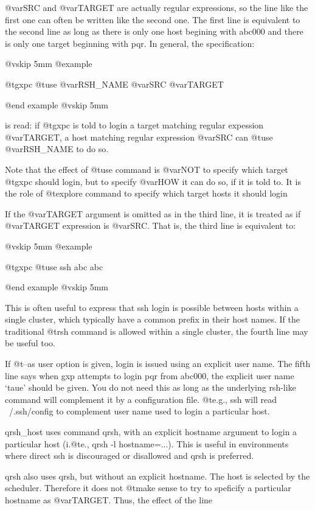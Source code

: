 @var{SRC} and @var{TARGET} are actually regular expressions, so the line like the
first one can often be written like the second one.  The first line
is equivalent to the second line as long as there is only one host
begining with abc000 and there is only one target beginning with pqr.
In general, the specification:

@vskip 5mm
@example

  @t{gxpc} @t{use} @var{RSH_NAME} @var{SRC} @var{TARGET}

@end example
@vskip 5mm

is read: if @t{gxpc} is told to login a target matching regular
expession @var{TARGET}, a host matching regular expression @var{SRC} can @t{use}
@var{RSH_NAME} to do so.

Note that the effect of @t{use} command is @var{NOT} to specify which target
@t{gxpc} should login, but to specify @var{HOW} it can do so, if it is told
to. It is the role of @t{explore} command to specify which target hosts it
should login

If the @var{TARGET} argument is omitted as in the third line, it is
treated as if @var{TARGET} expression is @var{SRC}. That is, the third line
is equivalent to:

@vskip 5mm
@example

  @t{gxpc} @t{use} ssh abc abc

@end example
@vskip 5mm

This is often useful to express that ssh login is possible
between hosts within a single cluster, which typically have a
common prefix in their host names. If the traditional @t{rsh} command
is allowed within a single cluster, the fourth line may be useful
too.

If @t{--as} user option is given, login is issued using an explicit user
name. The fifth line says when gxp attempts to login pqr from abc000,
the explicit user name `taue' should be given. You do not need this as
long as the underlying rsh-like command will complement it by a
configuration file. @t{e}.g., ssh will read ~/.ssh/config to complement
user name used to login a particular host.

qrsh_host uses command qrsh, with an explicit hostname argument
to login a particular host (i.@t{e}., qrsh -l hostname=...).  This is
useful in environments where direct ssh is discouraged or
disallowed and qrsh is preferred.

qrsh also uses qrsh, but without an explicit hostname. The host
is selected by the scheduler. Therefore it does not @t{make} sense to
try to speficify a particular hostname as @var{TARGET}.  Thus, the
effect of the line

